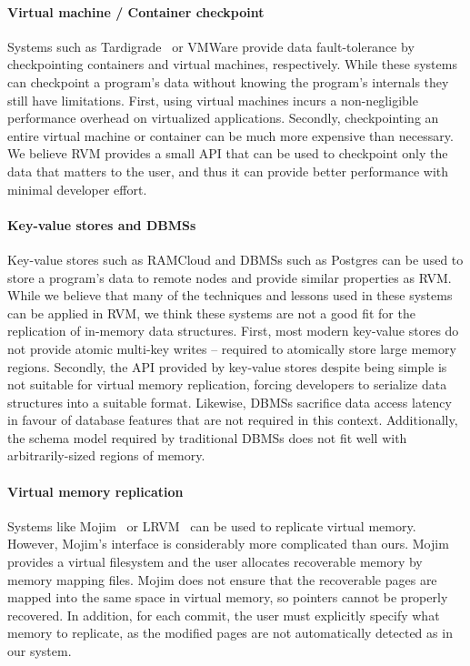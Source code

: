 \paragraph {\bf Virtual machine / Container checkpoint} Systems such as
Tardigrade~\cite{Tardigrade} or VMWare provide data fault-tolerance by
checkpointing containers and virtual machines, respectively.  While these
systems can checkpoint a program's data without knowing the program's internals
they still have limitations.  First, using virtual machines incurs a
non-negligible performance overhead on virtualized applications. Secondly,
checkpointing an entire virtual machine or container can be much more expensive
than necessary.  We believe RVM provides a small API that can be used to
checkpoint only the data that matters to the user, and thus it can provide
better performance with minimal developer effort.

\paragraph {\bf Key-value stores and DBMSs} Key-value stores such as RAMCloud
and DBMSs such as Postgres can be used to store a program's data to remote
nodes and provide similar properties as RVM. While we believe that many of the
techniques and lessons used in these systems can be applied in RVM, we think
these systems are not a good fit for the replication of in-memory data
structures.  First, most modern key-value stores do not provide atomic
multi-key writes -- required to atomically store large memory regions.
Secondly, the API provided by key-value stores despite being simple is not
suitable for virtual memory replication, forcing developers to serialize data
structures into a suitable format.  Likewise, DBMSs sacrifice data access
latency in favour of database features that are not required in this context.
Additionally, the schema model required by traditional DBMSs does not fit well
with arbitrarily-sized regions of memory.

\paragraph {\bf Virtual memory replication} Systems like Mojim~\cite{Mojim} or
LRVM~\cite{LRVM} can be used to replicate virtual memory. However, Mojim's
interface is considerably more complicated than ours. Mojim provides a virtual
filesystem and the user allocates recoverable memory by memory mapping files.
Mojim does not ensure that the recoverable pages are mapped into the same space
in virtual memory, so pointers cannot be properly recovered. In addition, for
each commit, the user must explicitly specify what memory to replicate, as the
modified pages are not automatically detected as in our system.

